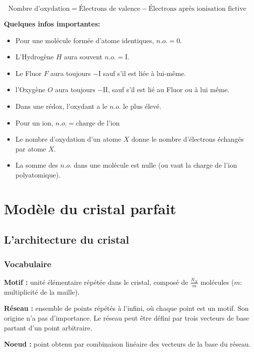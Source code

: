 \documentclass{article}
\begin{document}
$$\text{Nombre d'oxydation} = \text{Électrons de valence} - \text{Électrons après ionisation fictive}$$

\vspace{5mm}
\noindent\textbf{Quelques infos importantes:}
\begin{itemize}[label=$\ast$]
    \item Pour une molécule formée d'atome identiques, $n.o. = 0$.
    \item L'Hydrogène $H$ aura souvent $n.o. = \mathrm{I}$.
    \item Le Fluor $F$ aura toujours $-\mathrm{I}$ sauf s'il est liée à lui-même.
    \item l'Oxygène $O$ aura toujours $-\mathrm{II}$, sauf s'il est lié au Fluor ou à lui même.
    \item Dans une rédox, l'oxydant a le $n.o.$ le plus élevé.
    \item Pour un ion, $n.o. = \text{charge de l'ion}$
    \item Le nombre d'oxydation d'un atome $X$ donne le nombre d'électrons échangés par atome $X$.
    \item La somme des $n.o.$ dans une molécule est nulle (ou vaut la charge de l'ion polyatomique).
\end{itemize}


\section{Modèle du cristal parfait}\label{ch:modele-du-cristal-parfait}


\subsection{L'architecture du cristal}\label{sec:l'architecture-du-cristal}

\subsubsection{Vocabulaire}\label{subsec:vocabulaire}

\noindent\textbf{Motif :} unité élémentaire répétée dans le cristal, composé de $\frac{N_X}{m}$ molécules ($m$: multiplicité de la maille).

\noindent\textbf{Réseau :} ensemble de points répétés à l'infini, où chaque point est un motif. Son origine n'a pas d'importance.
Le réseau peut être défini par trois vecteurs de base partant d'un point arbitraire.

\noindent\textbf{Noeud :} point obtenu par combinaison linéaire des vecteurs de la base du réseau.
\end{document}
